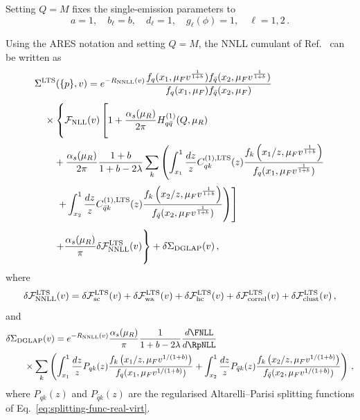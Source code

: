 Setting $Q=M$ fixes the single-emission parameters to
\begin{equation}
\label{eq:LTS-1-emsn}
	a=1, \quad b_\ell=b, \quad d_\ell=1, \quad g_\ell(\phi)=1,\quad \ell=1,2\,.
\end{equation}

Using the \textsc{ARES} notation and setting $Q=M$, the NNLL cumulant of
Ref.~\cite{vanBeekveld:2025zjh} can be written as
\begin{equation}
\label{eq:LTS-cum}
\begin{aligned}
&\Sigma^{\mathrm{LTS}}(\{p\},v)=e^{-R_{\mathrm{NNLL}}(v)}
\frac{f_q(x_1,\mu_F v^{\frac{1}{1+b}})f_{\bar q}(x_{2},\mu_F v^{\frac{1}{1+b}})}
{f_q(x_1,\mu_F )f_{\bar q}(x_{2},\mu_F )}\\[0.5ex]
&\quad\times\left\{\mathcal{F}_{\mathrm{NLL}}(v)\left[
1+\frac{\alpha_s(\mu_R)}{2\pi}H_{q\bar q}^{(1)}(Q,\mu_R)\vphantom{\frac{f_k\left(x_1/z,\mu_F v^{\frac{1}{1+b}}\right)}{f_{ q}(x_1,\mu_F v^{\frac{1}{1+b}})}}
\right.\right.\\[0.5ex]
&\qquad +\frac{\alpha_s(\mu_R)}{2\pi}\frac{1+b}{1+b-2\lambda}
\sum_k\left(
\int_{x_1}^1\frac{dz}{z}C_{qk}^{(1), \rm LTS}(z)
\frac{f_k\left(x_1/z,\mu_F v^{\frac{1}{1+b}}\right)}{f_{ q}(x_1,\mu_F v^{\frac{1}{1+b}})}\right.\\[0.5ex]
&\qquad\left.\left.\left.+\int_{x_2}^1\frac{dz}{z}C_{\bar{q}k}^{(1), \rm LTS}(z)
\frac{f_k\left(x_2/z,\mu_F v^{\frac{1}{1+b}}\right)}{f_{\bar{q}}(x_2,\mu_F v^{\frac{1}{1+b}})}\right)\right]\right.\\[0.5ex]
&\qquad\left.+\frac{\alpha_s(\mu_R)}{\pi}\delta\mathcal{F}^{\mathrm{LTS}}_{\mathrm{NNLL}}(v)\vphantom{\frac{f_k\left(x_1/z,\mu_F v^{\frac{1}{1+b}}\right)}{f_{ q}(x_1,\mu_F v^{\frac{1}{1+b}})}}\right\}+\delta\Sigma_{\mathrm{DGLAP}}(v)\,,
\end{aligned}
\end{equation}
where 
\begin{equation}
\label{eq:NNLL-LTS}
	\delta\mathcal{F}^{\rm LTS}_{\mathrm{NNLL}}(v)=\delta\mathcal{F}^{\rm LTS}_{\mathrm{sc}}(v)+\delta\mathcal{F}^{\rm LTS}_{\mathrm{wa}}(v)+\delta\mathcal{F}^{\rm LTS}_{\mathrm{hc}}(v)+\delta\mathcal{F}^{\rm LTS}_{\mathrm{correl}}(v)+\delta\mathcal{F}^{\rm LTS}_{\mathrm{clust}}(v)\,,
\end{equation}
and
\begin{equation}
\label{eq:DGLAP-add}
\begin{aligned}
	&\delta\Sigma_{\mathrm{DGLAP}}(v)=e^{-R_{\mathrm{NNLL}}(v)}\frac{\alpha_s(\mu_R)}{\pi}\frac{1}{1+b-2\lambda}\frac{d\FNLL}{d\RpNLL}\\
	&\qquad\times\sum_k\left(
\int_{x_1}^1\frac{dz}{z}P_{qk}(z)
\frac{f_k\left(x_1/z,\mu_F v^{1/(1+b)}\right)}{f_{ q}(x_{1},\mu_F v^{1/(1+b)})}
+\int_{x_2}^1\frac{dz}{z}P_{\bar{q}k}(z)
\frac{f_k\left(x_{2}/z,\mu_F v^{1/(1+b)}\right)}{f_{\bar{q}}(x_{2},\mu_F v^{1/(1+b)})}
\right)\,,
\end{aligned}
\end{equation}
where $P_{qk}(z)$ and $P_{\bar q k}(z)$ are the regularised Altarelli--Parisi
splitting functions of Eq.~\eqref{eq:splitting-func-real-virt}.

